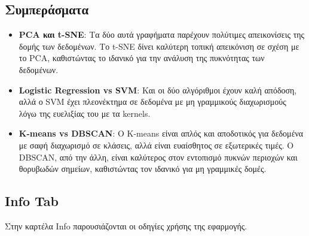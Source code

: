 \documentclass{article}
\begin{document}
\subsection{Συμπεράσματα}
\begin{itemize}
  \item \textbf{PCA και t-SNE}: Τα δύο αυτά γραφήματα παρέχουν πολύτιμες απεικονίσεις της δομής των δεδομένων. Το t-SNE δίνει καλύτερη τοπική απεικόνιση σε σχέση με το PCA, καθιστώντας το ιδανικό για την ανάλυση της πυκνότητας των δεδομένων.
  \item \textbf{Logistic Regression vs SVM}: Και οι δύο αλγόριθμοι έχουν καλή απόδοση, αλλά ο SVM έχει πλεονέκτημα σε δεδομένα με μη γραμμικούς διαχωρισμούς λόγω της ευελιξίας του με τα kernels.
  \item \textbf{K-means vs DBSCAN}: Ο K-means είναι απλός και αποδοτικός για δεδομένα με σαφή διαχωρισμό σε κλάσεις, αλλά είναι ευαίσθητος σε εξωτερικές τιμές. Ο DBSCAN, από την άλλη, είναι καλύτερος στον εντοπισμό πυκνών περιοχών και θορυβωδών σημείων, καθιστώντας τον ιδανικό για μη γραμμικές δομές.
\end{itemize}

\newpage
\subsection{Info Tab}
 Στην καρτέλα Info παρουσιάζονται οι οδηγίες χρήσης της εφαρμογής.
\end{document}
